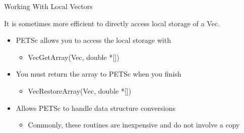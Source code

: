 \begin{frame}{Working With Local Vectors}

It is sometimes more efficient to directly access local storage of a {\kb Vec}.
\begin{itemize}
  \item PETSc allows you to access the local storage with
  \begin{itemize}
    \item {\kb VecGetArray(Vec, double *[])}
  \end{itemize}

  \item You must return the array to PETSc when you finish
  \begin{itemize}
    \item {\kb VecRestoreArray(Vec, double *[])}
  \end{itemize}

  \item Allows PETSc to handle data structure conversions
  \begin{itemize}
    \item Commonly, these routines are inexpensive and do not involve a copy
  \end{itemize}
\end{itemize}

\end{frame}
